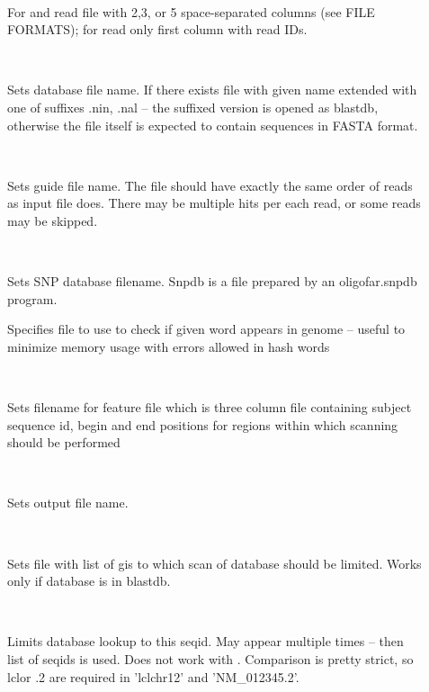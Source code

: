 \documentclass[english,letter]{article}
\begin{document}
\begin{description}
\item[~~]
    			For  and  read file with 2,3, 
				or 5 space-separated 
                columns (see FILE FORMATS); for  read only first column 
                with read IDs.
\item[~~]
				Sets database file name. If there exists file with given name
                extended with one of suffixes .nin, .nal -- the suffixed version 
                is opened as blastdb, otherwise the file itself is expected to
                contain sequences in FASTA format. 
\item[~~]
				Sets guide file name. The file should have exactly the same order 
                of reads as input file does. There may be multiple hits per each
                read, or some reads may be skipped.
\item[~~] 
				Sets SNP database filename. Snpdb is a file prepared by an
                oligofar.snpdb program.
\item[]
				Specifies file to use to check if given word appears in genome -- useful
				to minimize memory usage with errors allowed in hash words
\item[~~] 
				Sets filename for feature file which is three column file
                containing subject sequence id, begin and end positions for
                regions within which scanning should be performed
\item[~~]
				Sets output file name.
\item[~~]
				Sets file with list of gis to which scan of database should be
                limited. Works only if database is in blastdb.
\item[~~]
				Limits database lookup to this seqid. May appear multiple
                times -- then list of seqids is used. Does not work with .
                Comparison is pretty strict, so lcl\Bar  or .2 are required in
                'lcl\Bar chr12' and 'NM\_012345.2'. 
\item[]

\end{description}
\end{document}
